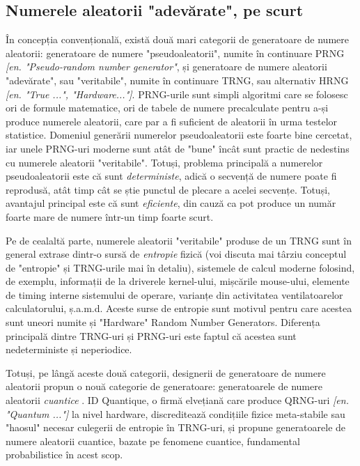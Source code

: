 \subsection{Numerele aleatorii "adevărate", pe scurt}
În concepția convențională, există două mari categorii de generatoare de numere aleatorii: generatoare de numere "pseudoaleatorii", numite în continuare PRNG \textit{[en. "Pseudo-random number generator"}, și generatoare de numere aleatorii "adevărate", sau "veritabile", numite în continuare TRNG, sau alternativ HRNG \textit{[en. "True ...", "Hardware..."]}. PRNG-urile sunt simpli algoritmi care se folosesc ori de formule matematice, ori de tabele de numere precalculate pentru a-și produce numerele aleatorii, care par a fi suficient de aleatorii în urma testelor statistice. Domeniul generării numerelor pseudoaleatorii este foarte bine cercetat, iar unele PRNG-uri moderne sunt atât de "bune" încât sunt practic de nedestins cu numerele aleatorii "veritabile". Totuși, problema principală a numerelor pseudoaleatorii este că sunt \textit{deterministe}, adică o secvență de numere poate fi reprodusă, atât timp cât se știe punctul de plecare a acelei secvențe. Totuși, avantajul principal este că sunt \textit{eficiente}, din cauză ca pot produce un număr foarte mare de numere într-un timp foarte scurt. 

Pe de cealaltă parte, numerele aleatorii "veritabile" produse de un TRNG sunt în general extrase dintr-o sursă de \textit{entropie} fizică (voi discuta mai târziu conceptul de "entropie" și TRNG-urile mai în detaliu), sistemele de calcul moderne folosind, de exemplu, informații de la driverele kernel-ului, mișcările mouse-ului, elemente de timing interne sistemului de operare, varianțe din activitatea ventilatoarelor calculatorului, ș.a.m.d. Aceste surse de entropie sunt motivul pentru care acestea sunt uneori numite și "Hardware" Random Number Generators. Diferența principală dintre TRNG-uri și PRNG-uri este faptul că acestea sunt nedeterministe și neperiodice. 

Totuși, pe lângă aceste două categorii, designerii de generatoare de numere aleatorii propun o nouă categorie de generatoare: generatoarele de numere aleatorii \textit{cuantice} \cite{IDQuantique:QuantumvsClassical}. ID Quantique, o firmă elvețiană care produce QRNG-uri \textit{[en. "Quantum ..."]} la nivel hardware, discreditează condițiile fizice meta-stabile sau "haosul" necesar culegerii de entropie în TRNG-uri, și propune generatoarele de numere aleatorii cuantice, bazate pe fenomene cuantice, fundamental probabilistice în acest scop.

